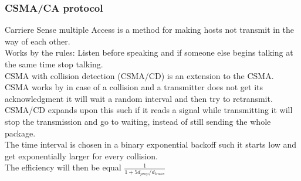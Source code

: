 \documentclass[12pt, a4paper]{article}
\begin{document}
			\subsubsection{CSMA/CA protocol}
				Carriere Sense multiple Access is a method for making hosts not transmit in the way of each other.\\
				Works by the rules: Listen before speaking and if someone else begins talking at the same time stop talking.\\
				CSMA with collision detection (CSMA/CD) is an extension to the CSMA.\\
				CSMA works by in case of a collision and a transmitter does not get its acknowledgment it will wait a random interval and then try to retransmit.\\
				CSMA/CD expands upon this such if it reads a signal while transmitting it will stop the transmission and go to waiting, instead of still sending the whole package.\\
				The time interval is chosen in a binary exponential backoff such it starts low and get exponentially larger for every collision.\\
				The efficiency will then be equal $\frac{1}{1+5d_{prop}/d_{trans}}$
\end{document}
